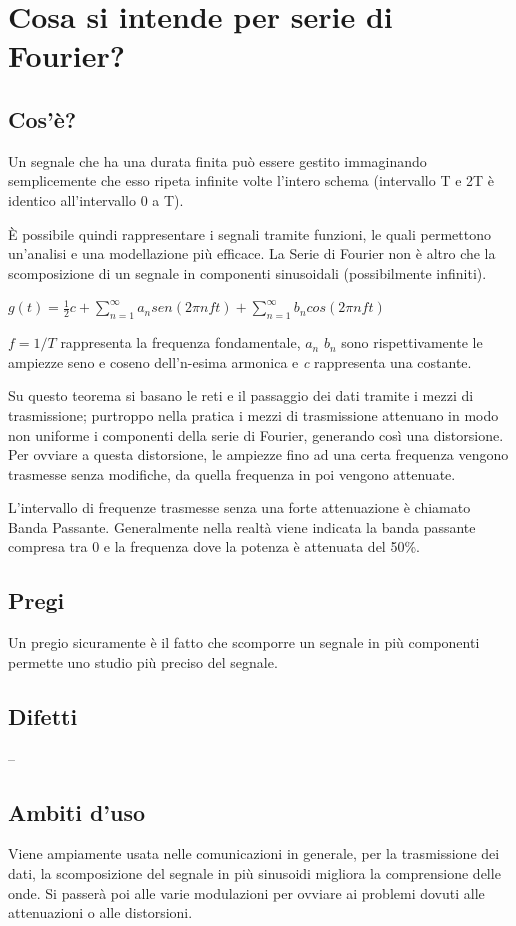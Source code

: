 \section{Cosa si intende per serie di Fourier?}
\subsection{Cos'è?}
Un segnale che ha una durata finita può essere gestito immaginando semplicemente che esso ripeta infinite volte l’intero schema (intervallo T e 2T è identico all’intervallo 0 a T).

È possibile quindi rappresentare i segnali tramite funzioni, le quali permettono un’analisi e una modellazione più efficace.
La Serie di Fourier non è altro che la scomposizione di un segnale in componenti sinusoidali (possibilmente infiniti).
\begin{center}
$g(t)=\frac{1}{2}c+\sum_{n=1}^\infty a_n sen(2\pi nft)+\sum_{n=1}^\infty b_n cos(2\pi nft)$ 
\end{center}

$f=1/T$ rappresenta la frequenza fondamentale, $a_n$  $b_n$  sono rispettivamente le ampiezze seno e coseno dell’n-esima armonica e \textit{c} rappresenta una costante.

Su questo teorema si basano le reti e il passaggio dei dati tramite i mezzi di trasmissione; purtroppo nella pratica i mezzi di trasmissione attenuano in modo non uniforme i componenti della serie di Fourier, generando così una distorsione. Per ovviare a questa distorsione, le ampiezze fino ad una certa frequenza vengono trasmesse senza modifiche, da quella frequenza in poi vengono attenuate.

L’intervallo di frequenze trasmesse senza una forte attenuazione è chiamato Banda Passante.
Generalmente nella realtà viene indicata la banda passante compresa tra 0 e la frequenza dove la potenza è attenuata del 50\%.
\subsection{Pregi}
Un pregio sicuramente è il fatto che scomporre un segnale in più componenti permette uno studio più preciso del segnale.

\subsection{Difetti}
--
\subsection{Ambiti d'uso}
Viene ampiamente usata nelle comunicazioni in generale, per la trasmissione dei dati, la scomposizione del segnale in più sinusoidi migliora la comprensione delle onde.
Si passerà poi alle varie modulazioni per ovviare ai problemi dovuti alle attenuazioni o alle distorsioni.

